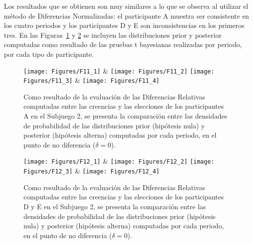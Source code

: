 Los resultados que se obtienen son muy similares a lo que se observa al utilizar el método de Diferencias Normalizadas: el participante A muestra ser consistente en los cuatro periodos y los participantes D y E son inconsistencias en los primeros tres. En las Figuras~\ref{fig:DR_S2_A} y \ref{fig:DR_S2_DyE} se incluyen las distribuciones prior y posterior computadas como resultado de las pruebas t bayesianas realizadas por periodo, por cada tipo de participante.\\

\begin{figure}[hp]
\centering
\texttt{[image: Figures/F11\_1]} & \texttt{[image: Figures/F11\_2]} 
\texttt{[image: Figures/F11\_3]} & \texttt{[image: Figures/F11\_4]} 
\decoRule
\caption[Evaluación de las Diferencias Relativas entre creencias y elecciones en los participantes A en el Subjuego 2 (Factor de Bayes)]{Como resultado de la evaluación de las Diferencias Relativas computadas entre las creencias y las elecciones de los participantes A en el Subjuego 2, se presenta la comparación entre las densidades de probabilidad de las distribuciones prior (hipótesis nula) y posterior (hipótesis alterna) computadas por cada periodo, en el punto de no diferencia ($\delta = 0$).}
\label{fig:DR_S2_A}
\end{figure}  


\begin{figure}[hp]
\centering
\texttt{[image: Figures/F12\_1]} & \texttt{[image: Figures/F12\_2]} 
\texttt{[image: Figures/F12\_3]} & \texttt{[image: Figures/F12\_4]} 
\decoRule
\caption[Evaluación de las Diferencias Relativas entre creencias y elecciones en los participantes D y E en el Subjuego 2 (Factor de Bayes)]{Como resultado de la evaluación de las Diferencias Relativas computadas entre las creencias y las elecciones de los participantes D y E en el Subjuego 2, se presenta la comparación entre las densidades de probabilidad de las distribuciones prior (hipótesis nula) y posterior (hipótesis alterna) computadas por cada periodo, en el punto de no diferencia ($\delta = 0$).}
\label{fig:DR_S2_DyE}
\end{figure}  


